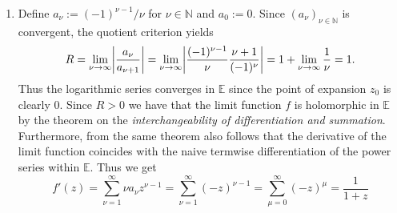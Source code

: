 \begin{enumerate}[label = \textbf{Exercise \arabic*.},wide = 0pt, itemsep=1.5ex]
\begin{enumerate}[label = (\alph*),wide = 0pt, itemsep=1.5ex]
\begin{proof}
			\noindent we get
			\begin{equation}
				\cosh z = \cos(iz) = \sum_{\nu = 0}^\infty \frac{(-1)^\nu}{(2\nu)!}(iz)^{2\nu} = \sum_{\nu = 0}^\infty \frac{(-1)^{2\nu}}{(2\nu)!}z^{2\nu} = \sum_{\nu = 0}^\infty \frac{z^{2\nu}}{(2\nu)!}
			\end{equation}

			\noindent and
			\begin{equation}
				\sinh z = -i\sin(iz) = -i \sum_{\nu = 0}^\infty \frac{(-1)^{\nu}}{(2\nu + 1)!}(iz)^{2\nu + 1} = \sum_{\nu = 0}^\infty \frac{(-1)^{2\nu}}{(2\nu + 1)!}z^{2\nu + 1} = \sum_{\nu = 0}^\infty \frac{z^{2\nu + 1}}{(2\nu + 1)!}
			\end{equation}
			\noindent for all $z \in \mathbb{Z}$.
			\end{proof}
			\begin{remark}
				The power series given in lemma \ref{lem:pow_cosh} can be rewritten into the standard form
				\begin{equation}
					\sum_{\nu = 0}^\infty a_\nu (z - z_0)^\nu
				\end{equation}

				\noindent by considering apropriate sequences $(a_\nu)_{\nu \in \mathbb{N}}$. Also it is clearly seen that $z_0 = 0$ is the point of expansion.
			\end{remark}

		\item Define $a_\nu := (-1)^{\nu - 1}/\nu$ for $\nu \in \mathbb{N}$ and $a_0 := 0$. Since $(a_\nu)_{\nu \in \mathbb{N}}$ is convergent, the quotient criterion yields
			\begin{equation}
				R = \lim_{\nu \to \infty} \abs[3]{\frac{a_\nu}{a_{\nu + 1}}} = \lim_{\nu \to \infty}\abs[3]{\frac{(-1)^{\nu - 1}}{\nu} \frac{\nu + 1}{(-1)^{\nu}}} = 1 + \lim_{\nu \to \infty}\frac{1}{\nu} = 1. 
			\end{equation}
			Thus the logarithmic series converges in $\mathbb{E}$ since the point of expansion $z_0$ is clearly $0$. Since $R > 0$ we have that the limit function $f$ is holomorphic in $\mathbb{E}$ by the theorem on the \emph{interchangeability of differentiation and summation}. Furthermore, from the same theorem also follows that the derivative of the limit function coincides with the naive termwise differentiation of the power series within $\mathbb{E}$. Thus we get
			\begin{equation}
				f'(z) = \sum_{\nu = 1}^\infty \nu a_\nu z^{\nu-1} = \sum_{\nu = 1}^\infty (-z)^{\nu-1} = \sum_{\mu = 0}^\infty (-z)^\mu = \frac{1}{1 + z}
			\end{equation}


\end{enumerate}
\end{enumerate}
